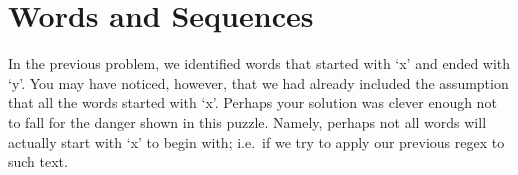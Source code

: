 \newpage

\hypertarget{words-and-sequences}{%
\section{Words and Sequences}\label{words-and-sequences}}

In the previous problem, we identified words that started with `x' and
ended with `y'. You may have noticed, however, that we had already
included the assumption that all the words started with `x'. Perhaps
your solution was clever enough not to fall for the danger shown in this
puzzle. Namely, perhaps not all words will actually start with `x' to
begin with; i.e.~if we try to apply our previous regex to such text.

\begin{Shaded}
\begin{Highlighting}[]
\OperatorTok{\textgreater{}\textgreater{}\textgreater{}}\OperatorTok{=} 
\OperatorTok{\textgreater{}\textgreater{}\textgreater{}}\OperatorTok{=}\NormalTok{(}\NormalTok{)}
\OperatorTok{\textgreater{}\textgreater{}\textgreater{}}
\NormalTok{[}\NormalTok{, }\NormalTok{, }\NormalTok{, }\NormalTok{,}
\NormalTok{, }\NormalTok{, }\NormalTok{, }\NormalTok{, }\NormalTok{, }\NormalTok{,}
\NormalTok{, }\NormalTok{, }\NormalTok{, }\NormalTok{, }\NormalTok{,}
\NormalTok{, }\NormalTok{, }\NormalTok{, }\NormalTok{, }\NormalTok{]}
\end{Highlighting}
\end{Shaded}

